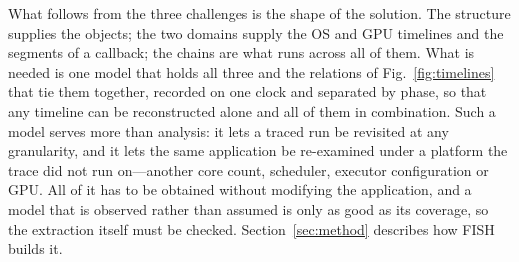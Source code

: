 What follows from the three challenges is the shape of the solution. The structure supplies the objects; the two domains supply the OS and GPU timelines and the segments of a callback; the chains are what runs across all of them. What is needed is one model that holds all three and the relations of Fig.~\ref{fig:timelines} that tie them together, recorded on one clock and separated by phase, so that any timeline can be reconstructed alone and all of them in combination. Such a model serves more than analysis: it lets a traced run be revisited at any granularity, and it lets the same application be re-examined under a platform the trace did not run on---another core count, scheduler, executor configuration or GPU. All of it has to be obtained without modifying the application, and a model that is observed rather than assumed is only as good as its coverage, so the extraction itself must be checked. Section~\ref{sec:method} describes how FISH builds it.

